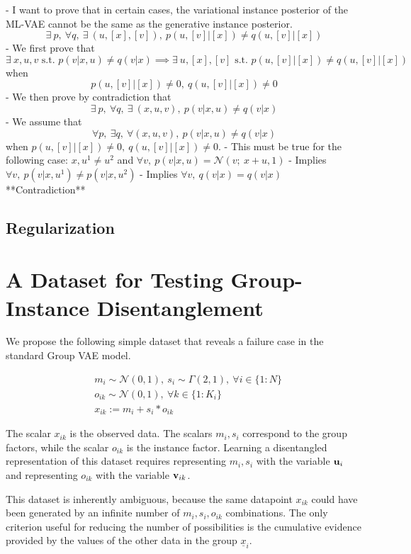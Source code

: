 \documentclass{article}
\begin{document}
- I want to prove that in certain cases, the variational instance posterior of the ML-VAE cannot be the same as the generative instance posterior. $$\exists ~ p, ~ \forall q, ~ \exists ~ (u, [x], [v]), ~ p(u, [v] | [x]) \neq q(u, [v] | [x])$$
	- We first prove that $$\exists ~ x, u, v \textrm{ s.t. } p(v|x,u) \neq q(v|x) \implies \exists ~ u, [x], [v] \textrm{ s.t. } p(u, [v] | [x]) \neq q(u, [v] | [x])$$ when $$p(u, [v] | [x]) \neq 0, ~ q(u, [v] | [x]) \neq 0$$
	- We then prove by contradiction that $$\exists ~ p, ~ \forall q, ~ \exists ~ (x, u, v), ~ p(v|x,u) \neq q(v|x)$$
		- We assume that $$\forall p, ~ \exists q, ~\forall (x, u, v), ~ p(v | x, u) \neq q(v | x)$$ when $p(u, [v] | [x]) \neq 0, ~ q(u, [v] | [x]) \neq 0$.
		- This must be true for the following case: $x, u^1 \neq u^2$ and $\forall v, ~ p(v | x, u) = \mathcal{N}(v; ~ x + u, 1)$
		- Implies $\forall v, ~ p(v | x, u^1) \neq p(v | x, u^2)$
		- Implies $\forall v, ~ q(v | x) = q(v | x)$ **Contradiction**

\subsection{Regularization}

\section{A Dataset for Testing Group-Instance Disentanglement}

We propose the following simple dataset that reveals a failure case in the standard Group VAE model.

\begin{align}
    & m_i \sim \mathcal{N}(0, 1), ~ s_i \sim \Gamma(2, 1), ~ \forall i \in \{1:N\} \\
    & o_{ik} \sim \mathcal{N}(0, 1), ~ \forall k \in \{1:K_i\} \\
    & x_{ik} := m_i + s_i * o_{ik}
\end{align}

The scalar $x_{ik}$ is the observed data. The scalars $m_i, s_i$ correspond to the group factors, while the scalar $o_{ik}$ is the instance factor. Learning a disentangled representation of this dataset requires representing $m_i, s_i$ with the variable ${\mathbf{u}}_i$ and representing $o_{ik}$ with the variable ${\mathbf{v}}_{ik}$.

This dataset is inherently ambiguous, because the same datapoint $x_{ik}$ could have been generated by an infinite number of $m_i, s_i, o_{ik}$ combinations. The only criterion useful for reducing the number of possibilities is the cumulative evidence provided by the values of the other data in the group $\underline{x}_i$.
\end{document}

